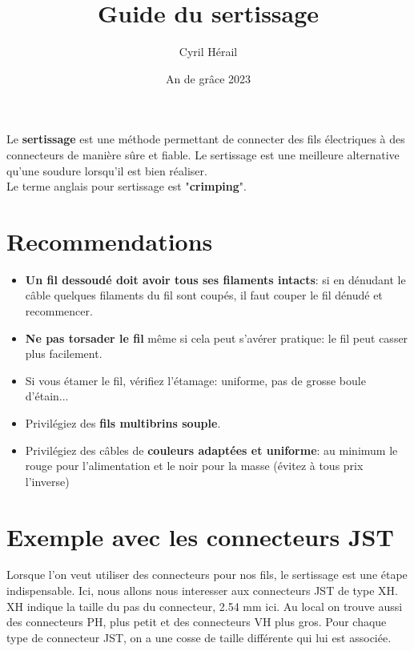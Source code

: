 \documentclass{article}
\title{Guide du sertissage}
\author{Cyril Hérail}
\date{An de grâce 2023}
\begin{document}
\maketitle

 Le \textbf{sertissage} est une méthode permettant de connecter des fils électriques à des connecteurs de manière sûre et fiable. Le sertissage est une meilleure alternative qu'une soudure lorsqu'il est bien réaliser. \\
 
 Le terme anglais pour sertissage est "\textbf{crimping}".

\section*{Recommendations}

\begin{itemize}
    \item \textbf{Un fil dessoudé doit avoir tous ses filaments intacts}: si en dénudant le câble quelques filaments du fil sont coupés, il faut couper le fil dénudé et recommencer.
    \item \textbf{Ne pas torsader le fil} même si cela peut s'avérer pratique: le fil peut casser plus facilement.
    \item Si vous étamer le fil, vérifiez  l'étamage: uniforme, pas de grosse boule d'étain... 
    \item Privilégiez des \textbf{fils multibrins souple}.
    \item Privilégiez des câbles de \textbf{couleurs adaptées et uniforme}: au minimum le rouge pour l'alimentation et le noir pour la masse (évitez à tous prix l'inverse)
\end{itemize}

\section*{Exemple avec les connecteurs JST}

Lorsque l'on veut utiliser des connecteurs pour nos fils, le sertissage est une étape indispensable. Ici, nous allons nous interesser aux connecteurs JST de type XH. \\
XH indique la taille du pas du connecteur, 2.54 mm ici. Au local on trouve aussi des connecteurs PH, plus petit et des connecteurs VH plus gros. Pour chaque type de connecteur JST, on a une cosse de taille différente qui lui est associée.
\end{document}
